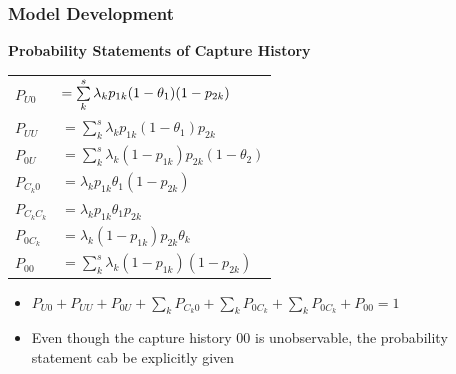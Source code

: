 \documentclass{beamer}
\begin{document}
\begin{frame} \frametitle{Model Development}
\textbf{{\footnotesize Probability Statements of Capture History}}
{\scriptsize  
\begin{center}
\begin{tabular}{l l}
\vspace{4pt}
$P_{U0}$&$= \sum\limits_{k}^{s} \lambda_{k}p_{1k}(1-\theta_{1})(1-p_{2k})  \vspace{4pt}$ \\ \vspace{4pt}
$P_{UU}$&$= \sum\limits_{k}^{s} \lambda_{k}p_{1k}(1-\theta_{1})p_{2k} $\\ \vspace{4pt}
$P_{0U}$&$= \sum\limits_{k}^{s} \lambda_{k}(1-p_{1k})p_{2k} (1-\theta_{2}) $\\ \vspace{4pt}
$P_{C_{k}0}$&$= \lambda_{k}p_{1k}\theta_{1}(1-p_{2k})$\\ \vspace{4pt}
$P_{C_{k}C_{k}}$&$= \lambda_{k}p_{1k}\theta_{1}p_{2k}$\\ \vspace{4pt}
$P_{0C_{k}}$&$= \lambda_{k}(1-p_{1k})p_{2k} \theta_{k}$\\ \vspace{4pt}
$P_{00}$&$= \sum\limits_{k}^{s} \lambda_{k}(1-p_{1k})(1-p_{2k}) $\\ 
\end{tabular}
\end{center}


\begin{itemize}
\item $P_{U0} + P_{UU}+P_{0U} + \sum\limits_{k}P_{C_{k}0} +\sum\limits_{k}P_{0C_{k}} +\sum\limits_{k}P_{0C_{k}} +P_{00} = 1$
\item Even though the capture history $00$ is unobservable, the probability statement cab be  explicitly given
\end{itemize}
}
\end{frame}


\end{document}
